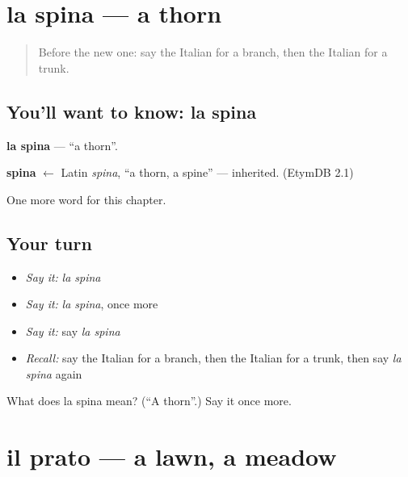 \section[la spina]{la spina — a thorn}

\label{lesson:IT-C200-spina}



\begin{quote}
Before the new one: say the Italian for a branch, then the Italian for a trunk.
\end{quote}

\subsection*{You'll want to know: la spina}
\textbf{la spina} — \textquotedblleft{}a thorn\textquotedblright{}.

\begin{cousinweb}
\textbf{spina} $\leftarrow$ Latin \emph{spina}, \textquotedblleft{}a thorn, a spine\textquotedblright{} — inherited. (EtymDB 2.1)
\end{cousinweb}

\begin{grammarlens}[title={What you've built}]
One more word for this chapter.
\end{grammarlens}

\subsection*{Your turn}
\begin{itemize}
\raggedright
  \item \emph{Say it:} \emph{la spina}
  \item \emph{Say it:} \emph{la spina}, once more
  \item \emph{Say it:} say \emph{la spina}
  \item \emph{Recall:} say the Italian for a branch, then the Italian for a trunk, then say \emph{la spina} again
\end{itemize}

\begin{tcolorbox}[breakable,colback=teal!4,colframe=teal!35!black,title={Before you move on}]
What does la spina mean? (\textquotedblleft{}A thorn\textquotedblright{}.) Say it once more.
\end{tcolorbox}
\section[il prato]{il prato — a lawn, a meadow}

